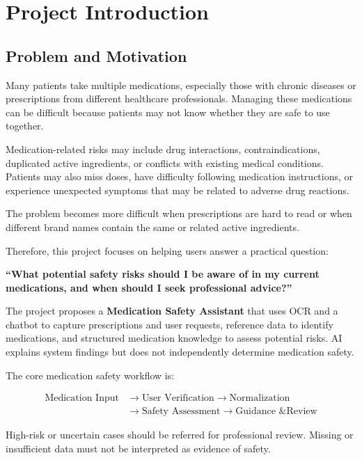 \section{Project Introduction}

\subsection{Problem and Motivation}

Many patients take multiple medications, especially those with chronic diseases or prescriptions from different healthcare professionals. Managing these medications can be difficult because patients may not know whether they are safe to use together.

Medication-related risks may include drug interactions, contraindications, duplicated active ingredients, or conflicts with existing medical conditions. Patients may also miss doses, have difficulty following medication instructions, or experience unexpected symptoms that may be related to adverse drug reactions.

The problem becomes more difficult when prescriptions are hard to read or when different brand names contain the same or related active ingredients.

Therefore, this project focuses on helping users answer a practical question:

\begin{center}
    \textbf{``What potential safety risks should I be aware of in my current medications, and when should I seek professional advice?''}
\end{center}

The project proposes a \textbf{Medication Safety Assistant} that uses OCR and a chatbot to capture prescriptions and user requests, reference data to identify medications, and structured medication knowledge to assess potential risks. AI explains system findings but does not independently determine medication safety.

The core medication safety workflow is:

\[
\begin{aligned}
\text{Medication Input}
&\rightarrow \text{User Verification}
\rightarrow \text{Normalization} \\
&\rightarrow \text{Safety Assessment}
\rightarrow \text{Guidance \& Review}
\end{aligned}
\]

High-risk or uncertain cases should be referred for professional review. Missing or insufficient data must not be interpreted as evidence of safety.


